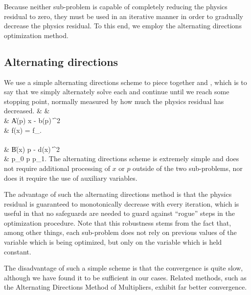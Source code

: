 Because neither sub-problem is capable of completely reducing the physics residual
    to zero, they must be used in an iterative manner in order to
    gradually decrease the physics residual.
To this end, we employ the alternating directions optimization method.

\subsection{Alternating directions}
We use a simple alternating directions scheme 
    to piece together  and ,
    which is to say that we simply
    alternately solve each and continue until we reach some stopping point,
    normally measured by how much the physics residual has decreased.
\BA {} & & \notag \\ 
&  \| A(p) x - b(p) \|^2 \notag \\
 &    \subto f(x) = f_. \notag \\ 
    \\
&  \| B(x) p - d(x) \|^2 \notag \\
    & \subto p_0 \le p \le p_1. \notag \EA
The alternating directions scheme is extremely simple
    and does not require additional processing
    of $x$ or $p$ outside of the two sub-problems,
    nor does it require the use of auxiliary variables.

The advantage of such the alternating directions method
    is that the physics residual is guaranteed to
    monotonically decrease with every iteration,
    which is useful in that no safeguards
    are needed to guard against ``rogue'' steps
    in the optimization procedure.
Note that this robustness stems from the fact that,
    among other things,
    each sub-problem does not rely on previous values of 
    the variable which is being optimized,
    but only on the variable which is held constant.

The disadvantage of such a simple scheme is that 
    the convergence is quite slow,
    although we have found it to be sufficient in our cases.
Related methods, such as the Alternating Directions Method of Multipliers\cite{admm}, 
    exhibit far better convergence.
